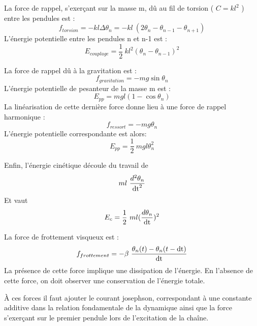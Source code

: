 La force de rappel, s'exerçant sur la masse m, dû au fil de torsion ( $C=kl^2$ ) entre les pendules est :
\[
f_{torsion} = -  k l \Delta \theta _n = -  k l\ (2\theta _n-\theta _{n-1}-\theta _{n+1})
\]
L'énergie potentielle entre les pendules n et n-1 est :
\[
E_{couplage} = \frac{1}{2}\ k l^2 (\theta _n-\theta _{n-1})^2
\]

La force de rappel dû à la gravitation est :
\[
f_{gravitation} = - m g \sin{\theta _n}
\]
L'énergie potentielle de pesanteur de la masse m est :
\[
E_{pp} = m g l (1 - \cos{\theta _n})
\]
La linéarisation de cette dernière force donne lieu à une force de rappel harmonique :
\[
f_{ressort} = - m g \theta _n
\]
L'énergie potentielle correspondante est alors:
\[
E_{pp} = \frac{1}{2}\ m g l \theta _n^2
\]

Enfin, l'énergie cinétique découle du travail de 
\[
m l\ \frac{d^2 \theta _n}{\operatorname{dt}^2}
\]
%
Et vaut
\[
E_{c} = \frac{1}{2}\ m l (\frac{d \theta _n}{\operatorname{dt}})^2
\]


La force de frottement visqueux est :
%
\[
f_{frottement} = -  \beta\ \frac{\theta _n(t) - \theta _n(t-\operatorname{dt})}{\operatorname{dt}}
\]
%
La présence de cette force implique une dissipation de l'énergie. En l'absence de cette force, on doit observer une conservation de l'énergie totale.

À ces forces il faut ajouter le courant josephson, correspondant à une constante additive dans la relation fondamentale de la dynamique ainsi que la force s'exerçant sur le premier pendule lors de l'excitation de la chaîne.
